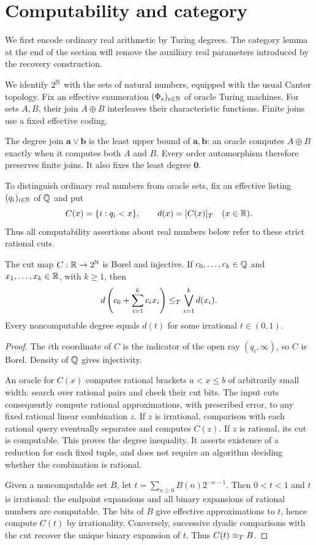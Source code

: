 \section{Computability and category}\label{sec:preliminaries}

We first encode ordinary real arithmetic by Turing degrees.
The category lemma at the end of the section will remove the
auxiliary real parameters introduced by the recovery construction.

We identify $2^\mathbb N$ with the sets of natural numbers, equipped with
the usual Cantor topology. Fix an effective enumeration
$(\Phi_e)_{e\in\mathbb N}$ of oracle Turing machines. For sets $A,B$, their
join $A\oplus B$ interleaves their characteristic functions.
Finite joins use a fixed effective coding.

The degree join $\mathbf a\vee\mathbf b$ is the least upper bound
of $\mathbf a,\mathbf b$: an oracle computes $A\oplus B$ exactly
when it computes both $A$ and $B$. Every order automorphism
therefore preserves finite joins. It also fixes the least degree
$\mathbf0$.

To distinguish ordinary real numbers from oracle sets, fix an
effective listing $(q_i)_{i\in\mathbb N}$ of $\mathbb Q$ and put
\[
C(x)=\{i:q_i<x\},\qquad d(x)=[C(x)]_T
\quad(x\in\mathbb R).
\]
Thus all computability assertions about real numbers below refer
to these strict rational cuts.

\begin{lemma}\label{lem:cuts}
The cut map $C:\mathbb R\to2^\mathbb N$ is Borel and injective. If
$c_0,\ldots,c_k\in\mathbb Q$ and $x_1,\ldots,x_k\in\mathbb R$, with $k\ge1$, then
\[
d\left(c_0+\sum_{i=1}^k c_ix_i\right)
\le_T \bigvee_{i=1}^k d(x_i).
\]
Every noncomputable degree equals $d(t)$ for some irrational
$t\in(0,1)$.
\end{lemma}

\begin{proof}
The $i$th coordinate of $C$ is the indicator of the open ray
$(q_i,\infty)$, so $C$ is Borel. Density of $\mathbb Q$ gives injectivity.

An oracle for $C(x)$ computes rational brackets $a<x\le b$ of
arbitrarily small width: search over rational pairs and check their
cut bits. The input cuts consequently compute rational
approximations, with prescribed error, to any fixed rational
linear combination $z$. If $z$ is irrational, comparison with
each rational query eventually separates and computes $C(z)$.
If $z$ is rational, its cut is computable. This proves the degree
inequality. It asserts existence of a reduction for each fixed
tuple, and does not require an algorithm deciding whether the
combination is rational.

Given a noncomputable set $B$, let
$t=\sum_{n\ge0}B(n)2^{-n-1}$. Then $0<t<1$ and $t$ is irrational:
the endpoint expansions and all binary expansions of rational
numbers are computable. The bits of $B$ give effective
approximations to $t$, hence compute $C(t)$ by irrationality.
Conversely, successive dyadic comparisons with the cut recover
the unique binary expansion of $t$. Thus $C(t)\equiv_T B$.
\end{proof}

